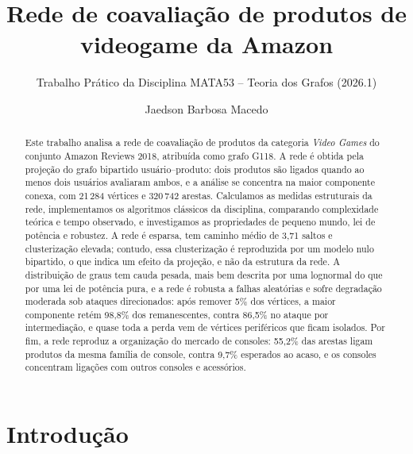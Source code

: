 \documentclass[sigconf,nonacm]{webmedia}
\begin{document}
\title[Rede de coavaliação da Amazon]{Rede de coavaliação de produtos de videogame da Amazon}
\subtitle{Trabalho Prático da Disciplina MATA53 -- Teoria dos Grafos (2026.1)}
\author{Jaedson Barbosa Macedo}
\renewcommand{\shortauthors}{Macedo}

\begin{abstract}
Este trabalho analisa a rede de coavaliação de produtos da categoria
\emph{Video Games} do conjunto Amazon Reviews 2018, atribuída como
grafo G118. A rede é obtida pela projeção do grafo bipartido
usuário--produto: dois produtos são ligados quando ao menos dois
usuários avaliaram ambos, e a análise se concentra na maior
componente conexa, com 21\,284 vértices e 320\,742 arestas. Calculamos
as medidas estruturais da rede, implementamos os algoritmos clássicos
da disciplina, comparando complexidade teórica e tempo observado, e
investigamos as propriedades de pequeno mundo, lei de potência e
robustez. A rede é esparsa, tem caminho médio de 3,71 saltos e
clusterização elevada; contudo, essa clusterização é reproduzida por um
modelo nulo bipartido, o que indica um efeito da projeção, e não da
estrutura da rede. A distribuição de graus tem cauda pesada, mais bem
descrita por uma lognormal do que por uma lei de potência pura, e a
rede é robusta a falhas aleatórias e sofre degradação moderada sob
ataques direcionados: após remover 5\% dos vértices, a maior componente
retém 98,8\% dos remanescentes, contra 86,5\% no ataque por
intermediação, e quase toda a perda vem de vértices periféricos que
ficam isolados. Por fim, a rede reproduz a organização do mercado de
consoles: 55,2\% das arestas ligam produtos da mesma família de
console, contra 9,7\% esperados ao acaso, e os consoles concentram
ligações com outros consoles e acessórios.
\end{abstract}

\maketitle

\section{Introdução}
\end{document}
